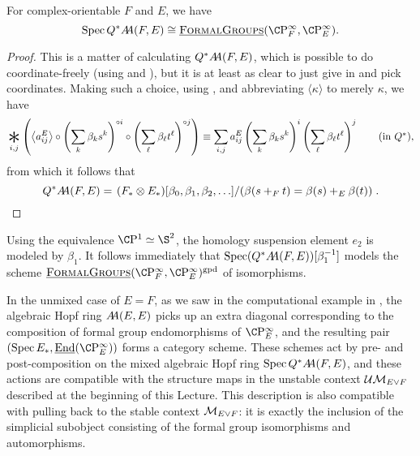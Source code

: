 \begin{corollary}
For complex-orientable \(F\) and \(E\), we have \[\Spec Q^* \AA(F, E) \cong \InternalHom{FormalGroups}(\CP^\infty_F, \CP^\infty_E).\]
\end{corollary}
\begin{proof}
This is a matter of calculating \(Q^* \AA(F, E)\), which is possible to do coordinate-freely (using  and \cite[Proposition 6.15]{StricklandFSFG}), but it is at least as clear to just give in and pick coordinates.  Making such a choice, using , and abbreviating $\langle \kappa \rangle$ to merely $\kappa$, we have \[\bigast_{i, j} \left(\left\<a_{ij}^E\right\> \circ \left( \sum_k \beta_k s^k \right)^{\circ i} \circ \left( \sum_\ell \beta_\ell t^\ell \right)^{\circ j} \right) \equiv \sum_{i, j} a_{ij}^E \left( \sum_k \beta_k s^k \right)^i \left( \sum_\ell \beta_\ell t^\ell \right)^j \tag{in \(Q^*\)},\] from which it follows that \[Q^* \AA(F, E) = \left. (F_* \otimes E_*)[\beta_0, \beta_1, \beta_2, \ldots] \middle/ \left( \beta(s +_F t) = \beta(s) +_E \beta(t) \right) \right. . \qedhere\]
\end{proof}

\begin{remark}
Using the equivalence \(\CP^1 \simeq \S^2\), the homology suspension element \(e_2\) is modeled by \(\beta_1\).  It follows immediately that \(\Spec (Q^* \AA(F, E))[\beta_1^{-1}]\) models the scheme \(\InternalHom{FormalGroups}(\CP^\infty_F, \CP^\infty_E)^{\mathrm{gpd}}\) of isomorphisms.
\end{remark}

\begin{remark}
In the unmixed case of \(E = F\), as we saw in the computational example in , the algebraic Hopf ring \(\AA(E, E)\) picks up an extra diagonal corresponding to the composition of formal group endomorphisms of \(\CP^\infty_E\), and the resulting pair \((\Spec E_*, \underline{\operatorname{End}}(\CP^\infty_E))\) forms a category scheme.  These schemes act by pre- and post-composition on the mixed algebraic Hopf ring \(\Spec Q^* \AA(F, E)\), and these actions are compatible with the structure maps in the unstable context \(\Ucontext{E \vee F}\) described at the beginning of this Lecture.  This description is also compatible with pulling back to the stable context \(\context{E \vee F}\): it is exactly the inclusion of the simplicial subobject consisting of the formal group isomorphisms and automorphisms.
\end{remark}













